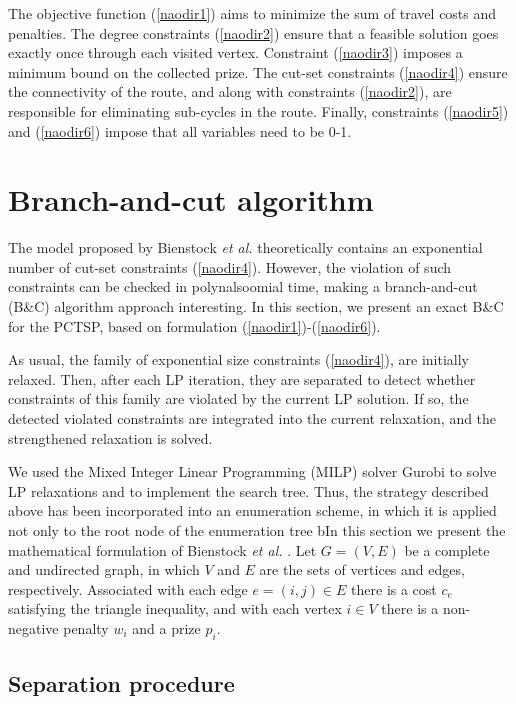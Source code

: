 \documentclass{ro}
\begin{document}
The objective function (\ref{naodir1}) aims to minimize the sum of travel costs and penalties. The degree constraints (\ref{naodir2}) ensure that a
feasible solution goes exactly once through each visited vertex. Constraint (\ref{naodir3}) imposes a minimum bound on the collected prize. The cut-set constraints (\ref{naodir4}) ensure the connectivity of the route, and along with constraints (\ref{naodir2}), are responsible for eliminating sub-cycles in the route. Finally, constraints (\ref{naodir5}) and (\ref{naodir6}) impose that all variables need to be 0-1.



\section{Branch-and-cut algorithm}
\label{sec:bc}


The model proposed by Bienstock \textit{et al.} \cite{bienstock1993note} theoretically contains an exponential number of cut-set constraints (\ref{naodir4}). However, the violation of such constraints can be checked in polynalsoomial time, making a  branch-and-cut (B\&C) algorithm approach interesting. In this section, we present an  exact B\&C for the PCTSP, based on formulation (\ref{naodir1})-(\ref{naodir6}).

As usual, the family of exponential size constraints (\ref{naodir4}), are initially
relaxed. Then, after each LP iteration, they are separated
to detect whether constraints of this family are
violated by the current LP solution. If so, the detected
violated constraints are integrated into the current relaxation, and the strengthened relaxation is solved.


We used the Mixed Integer Linear Programming (MILP) solver Gurobi to solve LP relaxations and to implement the search tree. Thus, the strategy described above has been incorporated into an enumeration scheme, in which it is applied not only to the root node of the enumeration tree bIn this section we present the mathematical formulation of Bienstock \textit{et al.} \cite{bienstock1993note}. 
Let $G = (V, E)$ be a complete and undirected graph, in which $V$ and $E$ are the sets of vertices and edges, respectively. Associated with each edge $e = (i, j) \in E$ there is a cost $c_e$ satisfying the triangle inequality, and with each vertex $i \in V$ there is a non-negative penalty $w_i$ and a prize $p_i$.


\subsection{Separation procedure}
\end{document}
